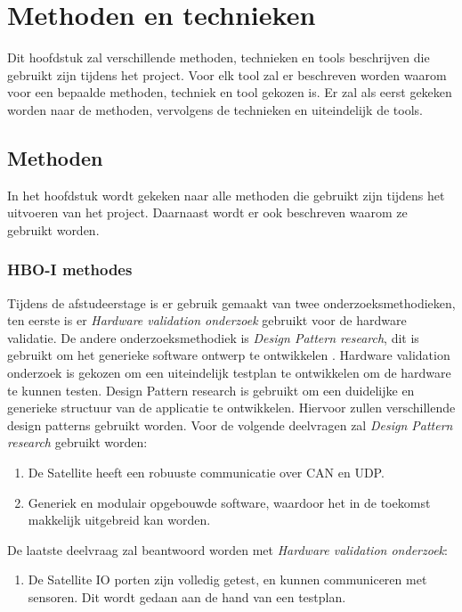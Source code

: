 \chapter{Methoden en technieken}
Dit hoofdstuk zal verschillende methoden, technieken en tools beschrijven die gebruikt zijn tijdens het project. Voor elk tool zal er beschreven worden waarom voor een bepaalde methoden, techniek en tool gekozen is. Er zal als eerst gekeken worden naar de methoden, vervolgens de technieken en uiteindelijk de tools.

\section{Methoden}
In het hoofdstuk wordt gekeken naar alle methoden die gebruikt zijn tijdens het uitvoeren van het project. Daarnaast wordt er ook beschreven waarom ze gebruikt worden.

\subsection{HBO-I methodes}
Tijdens de afstudeerstage is er gebruik gemaakt van twee onderzoeksmethodieken, ten eerste is er \textit{Hardware validation onderzoek} gebruikt voor de hardware validatie. De andere onderzoeksmethodiek is \textit{Design Pattern research}, dit is gebruikt om het generieke software ontwerp te ontwikkelen \parencite{researchmethods}. Hardware validation onderzoek is gekozen om een uiteindelijk testplan te ontwikkelen om de hardware te kunnen testen. Design Pattern research is gebruikt om een duidelijke en generieke structuur van de applicatie te ontwikkelen. Hiervoor zullen verschillende design patterns gebruikt worden. Voor de volgende deelvragen zal \textit{Design Pattern research} gebruikt worden: 
\begin{enumerate}
	\item De Satellite heeft een robuuste communicatie over CAN en UDP.
	\item Generiek en modulair opgebouwde software, waardoor het in de toekomst makkelijk uitgebreid kan worden.
\end{enumerate}

\noindent De laatste deelvraag zal beantwoord worden met \textit{Hardware validation onderzoek}:
\begin{enumerate}
	\item De Satellite IO porten zijn volledig getest, en kunnen communiceren met sensoren. Dit wordt gedaan aan de hand van een testplan.
\end{enumerate}

